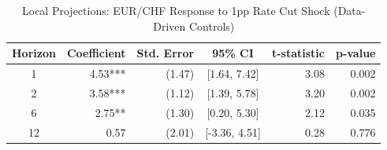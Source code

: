 \begin{table}[ht]
\centering
\caption{Local Projections: EUR/CHF Response to 1pp Rate Cut Shock (Data-Driven Controls)} 
\label{tab:lp_fx}
\begin{tabular}{crrcrr}
  \toprule
Horizon & Coefficient & Std. Error & 95\% CI & t-statistic & p-value \\ 
  \midrule
  1 & 4.53*** & (1.47) & [1.64, 7.42] & 3.08 & 0.002 \\ 
    2 & 3.58*** & (1.12) & [1.39, 5.78] & 3.20 & 0.002 \\ 
    6 & 2.75** & (1.30) & [0.20, 5.30] & 2.12 & 0.035 \\ 
   12 & 0.57 & (2.01) & [-3.36, 4.51] & 0.28 & 0.776 \\ 
   \bottomrule
\end{tabular}
\end{table}
